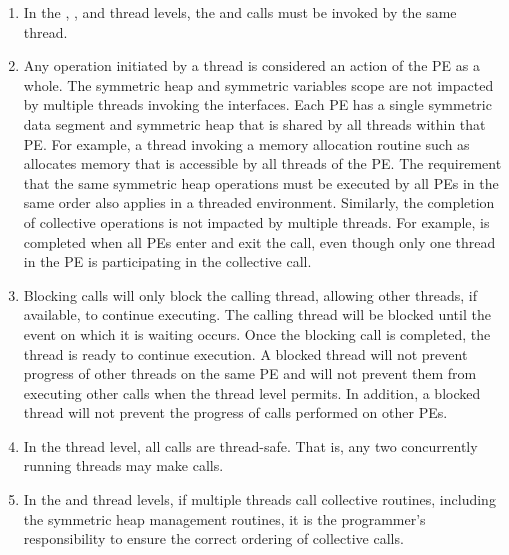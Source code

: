 \begin{enumerate}
\item
In the , , and
 thread levels, the  and
 calls must be invoked by the same thread.

\item
Any \openshmem operation initiated by a thread is considered an action of the
\ac{PE} as a whole. The symmetric heap and symmetric variables scope are not
impacted by multiple threads invoking the \openshmem interfaces.
Each \ac{PE} has a single symmetric data segment and symmetric heap that is shared by
all threads within that \ac{PE}.  For example, a thread invoking a memory allocation
routine such as  allocates memory that is accessible by
all threads of the \ac{PE}. The requirement that the same symmetric heap operations
must be executed by all \acp{PE} in the same order also applies in a threaded
environment. Similarly, the completion of collective operations is not impacted
by multiple threads. For example,  is completed when
all \acp{PE} enter and exit the  call, even though
only one thread in the \ac{PE} is participating in the collective call.

\item Blocking \openshmem calls will only block the calling thread, allowing
other threads, if available, to continue executing. The calling thread will
be blocked until the event on which it is waiting occurs. Once the blocking call is
completed, the thread is ready to continue execution. A blocked thread
will not prevent progress of other threads on the same \ac{PE} and will not
prevent them from executing other \openshmem calls when the thread level permits.
In addition, a blocked thread will not prevent the progress of \openshmem calls
performed on other \acp{PE}.

\item In the  thread level, all \openshmem calls
are thread-safe. That is, any two concurrently running threads may make \openshmem calls.

\item In the  and  thread levels,
if multiple threads call collective routines, including the symmetric heap
management routines, it is the programmer's responsibility to ensure the
correct ordering of collective calls.

\end{enumerate}
